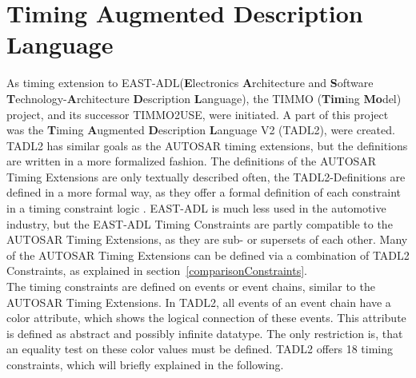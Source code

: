 \newpage

\section{Timing Augmented Description Language}
	As timing extension to EAST-ADL(\textbf{E}lectronics \textbf{A}rchitecture and \textbf{S}oftware \textbf{T}echnology-\textbf{A}rchitecture \textbf{D}escription \textbf{L}anguage), the TIMMO (\textbf{Tim}ing \textbf{Mo}del) project, and its successor TIMMO2USE, were initiated. A part of this project was the \textbf{T}iming \textbf{A}ugmented \textbf{D}escription \textbf{L}anguage V2 (TADL2), were created. TADL2 has similar goals as the AUTOSAR timing extensions, but the definitions are written in a more formalized fashion. The definitions of the AUTOSAR Timing Extensions are only textually described often, the TADL2-Definitions are defined in a more formal way, as they offer a formal definition of each constraint in a timing constraint logic \cite{TIMMO2USE}. EAST-ADL is much less used in the automotive industry, but the EAST-ADL Timing Constraints are partly compatible to the AUTOSAR Timing Extensions, as they are sub- or supersets of each other. Many of the AUTOSAR Timing Extensions can be defined via a combination of TADL2 Constraints, as explained in section~\ref{comparisonConstraints}.\\
	The timing constraints are defined on events or event chains, similar to the AUTOSAR Timing Extensions. In TADL2, all events of an event chain have a color attribute, which shows the logical connection of these events. This attribute is defined as abstract and possibly infinite datatype. The only restriction is, that an equality test on these color values must be defined. TADL2 offers 18 timing constraints, which will briefly explained in the following.
